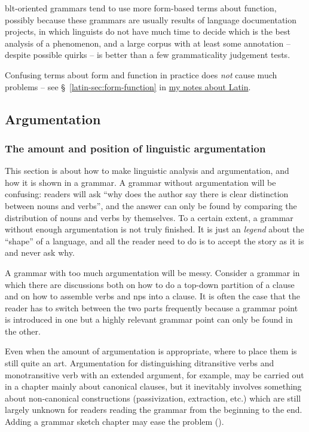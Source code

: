 \documentclass[UTF8, a4paper, oneside, scheme=plain]{ctexart}
\newcommand*{\citesec}[1]{\S~{#1}}
\newcommand{\latin}{\href{../Latin/latin-notes.pdf}{my notes about Latin}}
\begin{document}
\ac{blt}-oriented grammars tend to use more form-based terms about function,
possibly because these grammars are usually results of language documentation projects,
in which linguists do not have much time to decide which is the best analysis of a phenomenon,
and a large corpus with at least some annotation 
-- despite possible quirks -- 
is better than a few grammaticality judgement tests.

Confusing terms about form and function in practice does \emph{not} cause much problems
-- see \citesec{\ref{latin-sec:form-function}} in \latin.

\subsection{Argumentation}\label{sec:argumentation}

\subsubsection{The amount and position of linguistic argumentation}\label{sec:argumentation-amount}

This section is about how to make linguistic analysis and argumentation,
and how it is shown in a grammar.
A grammar without argumentation will be confusing:
readers will ask ``why does the author say there is clear distinction between nouns and verbs'',
and the answer can only be found by comparing the distribution of nouns and verbs by themselves.
To a certain extent, a grammar without enough argumentation is not truly finished.
It is just an \emph{legend} about the ``shape'' of a language,
and all the reader need to do is to accept the story as it is and never ask why.

A grammar with too much argumentation will be messy.
Consider a grammar in which there are discussions both 
on how to do a top-down partition of a clause 
and on how to assemble verbs and \ac{np}s into a clause. %
It is often the case that the reader has to switch between the two parts frequently 
because a grammar point is introduced in one 
but a highly relevant grammar point can only be found in the other.

Even when the amount of argumentation is appropriate,
where to place them is still quite an art.
Argumentation for distinguishing ditransitive verbs and monotransitive verb with an extended argument,
for example, may be carried out in a chapter mainly about canonical clauses,
but it inevitably involves something about non-canonical constructions 
(passivization, extraction, etc.)
which are still largely unknown for readers reading the grammar from the beginning to the end.
Adding a grammar sketch chapter may ease the problem ().
\end{document}
